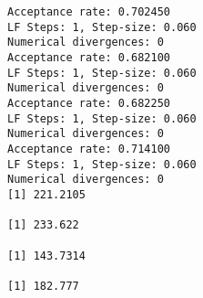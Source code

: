 \documentclass[11pt]{article}
\begin{document}
    \begin{Verbatim}[commandchars=\\\{\}]
Acceptance rate: 0.702450
LF Steps: 1, Step-size: 0.060
Numerical divergences: 0
Acceptance rate: 0.682100
LF Steps: 1, Step-size: 0.060
Numerical divergences: 0
Acceptance rate: 0.682250
LF Steps: 1, Step-size: 0.060
Numerical divergences: 0
Acceptance rate: 0.714100
LF Steps: 1, Step-size: 0.060
Numerical divergences: 0
[1] 221.2105

[1] 233.622

[1] 143.7314

[1] 182.777


    \end{Verbatim}

    \begin{center}
    \end{center}
    { \hspace*{\fill} \\}
    
\end{document}
